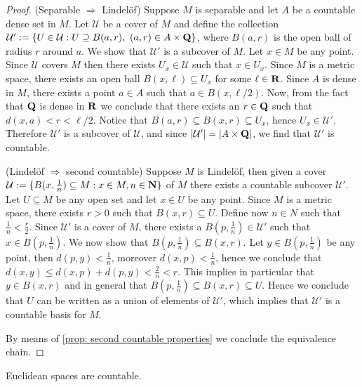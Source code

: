\begin{proof}
  (Separable \(\Rightarrow\) Lindelöf) Suppose \(M\) is separable and let \(A\)
  be a countable dense set in \(M\). Let \(\mathcal U\) be a cover of \(M\) and
  define the collection \(\mathcal U' := \{U \in \mathcal U : U \supseteq B(a,
  r),\ (a, r) \in A \times \mathbf{Q}\}\), where \(B(a,r)\) is the open ball of
  radius \(r\) around \(a\). We show that \(\mathcal U'\) is a subcover of
  \(M\).
  Let \(x \in M\) be any point. Since \(\mathcal U\) covers \(M\) then there
  exists \(U_x \in \mathcal U\) such that \(x \in U_x\). Since \(M\) is a metric
  space, there exists an open ball \(B(x, \ell) \subseteq U_x\) for some \(\ell
  \in \mathbf{R}\).
  Since \(A\) is dense in \(M\), there exists a point \(a \in A\) such that \(a
  \in B(x, \ell/2)\). Now, from the fact that \(\mathbf{Q}\) is dense in
  \(\mathbf{R}\) we conclude that there exists an \(r \in \mathbf{Q}\) such that
  \(d(x, a) < r < \ell/2\). Notice that \(B(a, r) \subseteq B(x, r) \subseteq
  U_x\), hence \(U_x \in \mathcal U'\). Therefore \(\mathcal U'\) is a subcover
  of \(\mathcal U\), and since \(|\mathcal U'| = |A \times \mathbf{Q}|\), we
  find that \(\mathcal U'\) is countable.

  (Lindelöf \(\Rightarrow\) second countable) Suppose \(M\) is Lindelöf, then
  given a cover \(\mathcal U := \{B(x, \frac{1}{n}) \subseteq M : x \in M, n \in
  \mathbf{N}\}\) of \(M\) there exists a countable subcover \(\mathcal U'\). Let
  \(U \subseteq M\) be any open set and let \(x \in U\) be any point. Since
  \(M\) is a metric space, there exists \(r > 0\) such that \(B(x, r) \subseteq
  U\). Define now \(n \in N\) such that \(\frac 1 n < \frac r 2\). Since
  \(\mathcal U'\) is a cover of \(M\), there exists a \(B(p, \frac 1 n) \in
  \mathcal U'\) such that \(x \in B(p, \frac 1 n)\). We now show that \(B(p,
  \frac 1 n) \subseteq B(x, r)\). Let \(y \in B(p, \frac 1 n)\) be any point,
  then \(d(p, y) < \frac 1 n\), moreover \(d(x, p) < \frac 1 n\), hence we
  conclude that \(d(x, y) \leq d(x, p) + d(p, y) < \frac 2 n < r\). This implies
  in particular that \(y \in B(x, r)\) and in general that \(B(p, \frac 1 n)
  \subseteq B(x, r) \subseteq U\). Hence we conclude that \(U\) can be written
  as a union of elements of \(\mathcal U'\), which implies that \(\mathcal U'\)
  is a countable basis for \(M\).

  By means of \cref{prop: second countable properties} we conclude the
  equivalence chain.
\end{proof}

\begin{corollary}
\label{cor:euclidean-space-second-countable}
Euclidean spaces are countable.
\end{corollary}

